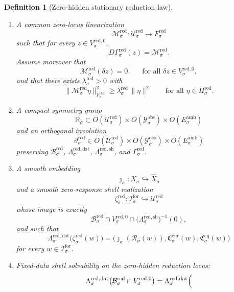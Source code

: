 \documentclass[11pt]{article}
\newcommand{\ForSpace}[1]{\mathcal I_{#1}^{\mathrm{for}}}
\newcommand{\Reduction}[1]{\mathcal R_{#1}}
\newcommand{\CurrentCarrier}[1]{\mathfrak C_{#1}^{\mathrm{cur}}}
\newcommand{\EqCarrier}[1]{\mathfrak C_{#1}^{\mathrm{eq}}}
\newcommand{\VisibleAffine}[1]{\widehat X_{#1}}
\newcommand{\DataSpace}[1]{\mathcal Y_{#1}^{\mathrm{obs}}}
\newcommand{\AmbientTarget}[1]{E_{#1}^{\mathrm{amb}}}
\newcommand{\RedSpace}[1]{\mathcal U_{#1}^{\mathrm{red}}}
\newcommand{\RedBody}[1]{\mathcal B_{#1}^{\mathrm{red}}}
\newcommand{\RedData}[1]{\Lambda_{#1}^{\mathrm{red,dat}}}
\newcommand{\RedShell}[1]{\Lambda_{#1}^{\mathrm{red,sh}}}
\newcommand{\RedTarget}[1]{F_{#1}^{\mathrm{red}}}
\newcommand{\RedMap}[1]{\Gamma_{#1}^{\mathrm{red}}}
\newcommand{\RedZero}[1]{V_{#1}^{\mathrm{red},0}}
\newcommand{\RedHidden}[1]{H_{#1}^{\mathrm{red}}}
\newcommand{\RedLin}[1]{\mathcal M_{#1}^{\mathrm{red}}}
\newcommand{\RedSym}[1]{\mathbb R_{#1}}
\newcommand{\RedTime}[1]{\vartheta_{#1}^{\mathrm{red}}}
\newcommand{\RedEmbed}[1]{\zeta_{#1}^{\mathrm{red}}}
\newtheorem{definition}{Definition}
\begin{document}
\begin{definition}[Zero-hidden stationary reduction law]
\begin{enumerate}
    \item A common zero-locus linearization
    \[
    \RedLin{\sigma}:\RedSpace{\sigma}\to\RedTarget{\sigma}
    \]
    such that for every \(z\in\RedZero{\sigma}\),
    \begin{equation}
    D\RedMap{\sigma}(z)=\RedLin{\sigma}.
    \label{eq:redlinearization}
    \end{equation}
    Assume moreover that
    \begin{equation}
    \RedLin{\sigma}(\delta z)=0
    \qquad
    \text{for all }\delta z\in\RedZero{\sigma},
    \label{eq:redzero}
    \end{equation}
    and that there exists \(\lambda_{\sigma}^{\mathrm{red}}>0\) with
    \begin{equation}
    \|\RedLin{\sigma}\eta\|_{\RedTarget{\sigma}}^{2}
    \ge
    \lambda_{\sigma}^{\mathrm{red}}\,
    \|\eta\|^{2}
    \qquad
    \text{for all }\eta\in\RedHidden{\sigma}.
    \label{eq:redgap}
    \end{equation}
    \item A compact symmetry group
    \[
    \RedSym{\sigma}\subset
    O(\RedSpace{\sigma})\times
    O(\DataSpace{\sigma})\times
    O(\AmbientTarget{\sigma})
    \]
    and an orthogonal involution
    \[
    \RedTime{\sigma}\in
    O(\RedSpace{\sigma})\times
    O(\DataSpace{\sigma})\times
    O(\AmbientTarget{\sigma})
    \]
    preserving \(\RedBody{\sigma}\), \(\RedData{\sigma}\), \(\RedShell{\sigma}\), and \(\RedMap{\sigma}\).
    \item A smooth embedding
    \[
    \jmath_{\sigma}:X_{\sigma}\hookrightarrow\VisibleAffine{\sigma}
    \]
    and a smooth zero-response shell realization
    \[
    \RedEmbed{\sigma}:\ForSpace{\sigma}\hookrightarrow\RedSpace{\sigma}
    \]
    whose image is exactly
    \[
    \RedBody{\sigma}\cap
    \RedZero{\sigma}\cap
    \bigl(\RedShell{\sigma}\bigr)^{-1}(0),
    \]
    and such that
    \begin{equation}
    \RedData{\sigma}\bigl(\RedEmbed{\sigma}(w)\bigr)
    =
    \bigl(
    \jmath_{\sigma}(\Reduction{\sigma}(w)),
    \CurrentCarrier{\sigma}(w),
    \EqCarrier{\sigma}(w)
    \bigr)
    \label{eq:redcompat}
    \end{equation}
    for every \(w\in\ForSpace{\sigma}\).
    \item Fixed-data shell solvability on the zero-hidden reduction locus:
    \begin{equation}
    \RedData{\sigma}\bigl(
    \RedBody{\sigma}\cap\RedZero{\sigma}
    \bigr)
    =
    \RedData{\sigma}\Bigl(

\end{equation}
\end{enumerate}
\end{definition}
\end{document}
